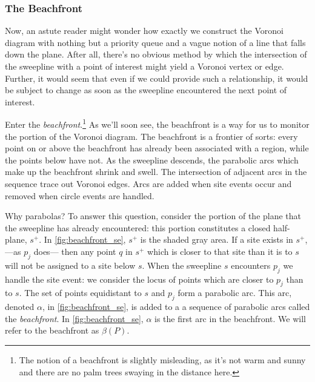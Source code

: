 \documentclass[12pt,twoside]{reedthesis}
\begin{document}

      \subsubsection{The Beachfront} %
      \label{ssub:the_beachfront}
        Now, an astute reader might wonder how exactly we construct the Voronoi diagram with nothing but a priority queue and a vague notion of a line that falls down the plane. After all, there's no obvious method by which the intersection of the sweepline with a point of interest might yield a Voronoi vertex or edge. Further, it would seem that even if we could provide such a relationship, it would be subject to change as soon as the sweepline encountered the next point of interest. \par

        Enter the \emph{beachfront}.\footnote{The notion of a beachfront is slightly misleading, as it's not warm and sunny and there are no palm trees swaying in the distance here.} As we'll soon see, the beachfront is a way for us to monitor the  portion of the Voronoi diagram. The beachfront is a frontier of sorts: every point on or above the beachfront has already been associated with a region, while the points below have not. As the sweepline descends, the parabolic arcs which make up the beachfront shrink and swell. The intersection of adjacent arcs in the sequence trace out Voronoi edges. Arcs are added when site events occur and removed when circle events are handled.\par

        Why parabolas? To answer this question, consider the portion of the plane that the sweepline has already encountered: this portion constitutes a closed half-plane, $s^+$. In \cref{fig:beachfront_se}, $s^+$ is the shaded gray area. If a site exists in $s^+$,---as $p_{j}$ does--- then any point $q$ in $s^+$ which is closer to that site than it is to $s$ will not be assigned to a site below $s$. When the sweepline $s$ encounters $p_{j}$ we handle the site event: we consider the locus of points which are closer to $p_{j}$ than to $s$. The set of points equidistant to $s$ and $p_{j}$ form a parabolic arc. This arc, denoted $\alpha$, in \cref{fig:beachfront_se}, is added to a a sequence of parabolic arcs called the \emph{beachfront}. In \cref{fig:beachfront_se}, $\alpha$ is the first arc in the beachfront. We will refer to the beachfront as $\beta(P)$. \par
\end{document}
